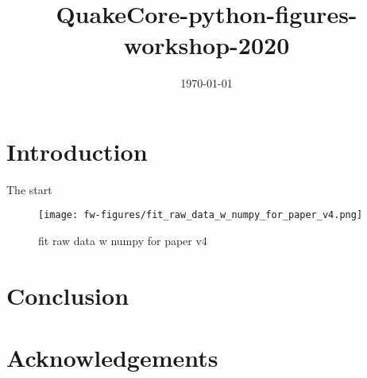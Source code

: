 \documentclass[times]{article}
\begin{document}
\title{QuakeCore-python-figures-workshop-2020}

\onecolumn

\author{}
\date{\today}

\maketitle


\tableofcontents

\newpage

\section{Introduction}

The start

\begin{figure}[H]
\centering
\texttt{[image: fw-figures/fit\_raw\_data\_w\_numpy\_for\_paper\_v4.png]}
\caption{fit raw data w numpy for paper v4 \label{fig: fit_raw_data_w_numpy_for_paper_v4}}
\end{figure}

\section{Conclusion}

\section{Acknowledgements}



\end{document}
